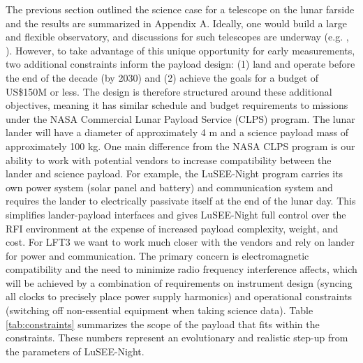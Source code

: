 The previous section outlined the science case for a telescope on the lunar farside and the results are summarized in Appendix A.  Ideally, one would build a large and flexible observatory, and discussions for such telescopes are underway (e.g. \citealt{burns2021lunarfarsidelowradio}, \citealt{9438165}).  However, to take advantage of this unique opportunity for early measurements, two additional constraints inform the payload design: (1) land and operate before the end of the decade (by 2030) and (2) achieve the goals for a budget of US\$150M or less.  The design is therefore structured around these additional objectives, meaning it has similar schedule and budget requirements to missions under the NASA Commercial Lunar Payload Service (CLPS) program.  The lunar lander will have a diameter of approximately 4 m and a science payload mass of approximately 100 kg.  One main difference from the NASA CLPS program is our ability to work with potential vendors to increase compatibility between the lander and science payload. For example, the LuSEE-Night program carries its own power system (solar panel and battery) and communication system and requires the lander to electrically passivate itself at the end of the lunar day. This simplifies lander-payload interfaces and gives LuSEE-Night full control over the RFI environment at the expense of increased payload complexity, weight, and cost. For LFT3 we want to work much closer with the vendors and rely on lander for power and communication.   The primary concern is electromagnetic compatibility and the need to minimize radio frequency interference affects, which will be achieved by a combination of requirements on instrument design (syncing all clocks to precisely place power supply harmonics) and operational constraints (switching off non-essential equipment when taking science data). Table \ref{tab:constraints} summarizes the scope of the payload that fits within the constraints. These numbers represent an evolutionary and realistic step-up from the parameters of LuSEE-Night.

